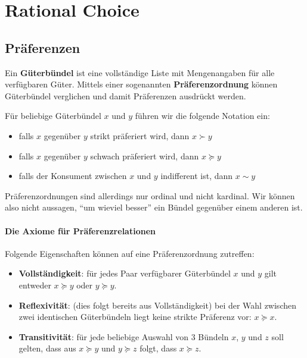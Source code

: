 \chapter{Rational Choice}

\section{Präferenzen}

Ein \textbf{Güterbündel} ist eine vollständige Liste mit Mengenangaben für alle verfügbaren Güter. Mittels einer sogenannten \textbf{Präferenzordnung} können Güterbündel verglichen und damit Präferenzen ausdrückt werden. ~\bigskip

Für beliebige Güterbündel $x$ und $y$ führen wir die folgende Notation ein:
\begin{itemize}
	\item falls $x$ gegenüber $y$ strikt präferiert wird, dann $x \succ y$
	\item falls $x$ gegenüber $y$ schwach präferiert wird, dann $x \succeq y$
	\item falls der Konsument zwischen $x$ und $y$ indifferent ist, dann $x \sim y$
\end{itemize}

Präferenzordnungen sind allerdings nur ordinal und nicht kardinal. Wir können also nicht aussagen, \enquote{um wieviel besser} ein Bündel gegenüber einem anderen ist.

\subsubsection*{Die Axiome für Präferenzrelationen}

Folgende Eigenschaften können auf eine Präferenzordnung zutreffen:

\begin{itemize}
	\item \textbf{Vollständigkeit}: für jedes Paar verfügbarer Güterbündel $x$ und $y$ gilt entweder $x \succeq y$ oder $y \succeq y$. 
	\item \textbf{Reflexivität}: (dies folgt bereits aus Vollständigkeit) bei der Wahl zwischen zwei identischen Güterbündeln liegt keine strikte Präferenz vor: $x \succeq x$.
	\item \textbf{Transitivität}: für jede beliebige Auswahl von 3 Bündeln $x$, $y$ und $z$ soll gelten, dass aus $x \succeq y$ und $y \succeq z$ folgt, dass $x \succeq z$.
\end{itemize}

